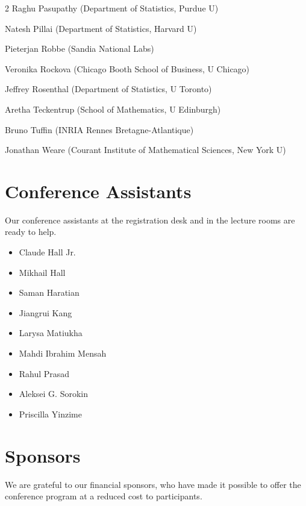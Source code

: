 \documentclass[12pt,lettersize,oneside]{book} %
\begin{document}
\begin{multicols}{2}
Raghu Pasupathy (Department of Statistics, Purdue U)

Natesh Pillai (Department of Statistics, Harvard U)

Pieterjan Robbe (Sandia National Labs)

Veronika Rockova (Chicago Booth School of Business, U Chicago)

Jeffrey Rosenthal (Department of Statistics, U Toronto)

Aretha Teckentrup (School of Mathematics, U Edinburgh)

Bruno Tuffin (INRIA Rennes Bretagne-Atlantique)

Jonathan Weare (Courant Institute of Mathematical Sciences, New York U)


\end{multicols}



\section{Conference Assistants} \label{assistants}
Our conference assistants at the registration desk and in the lecture rooms are ready to help.


\begin{itemize}
	\item Claude Hall Jr.
	\item Mikhail Hall
	\item Saman Haratian
	\item Jiangrui Kang
	\item Larysa Matiukha
	\item Mahdi Ibrahim Mensah
	\item Rahul Prasad
	\item Aleksei G. Sorokin
	\item Priscilla Yinzime
\end{itemize}


\section{Sponsors}

We are grateful to our financial sponsors, who have made it possible to offer the conference program at a reduced cost to participants.
\end{document}
